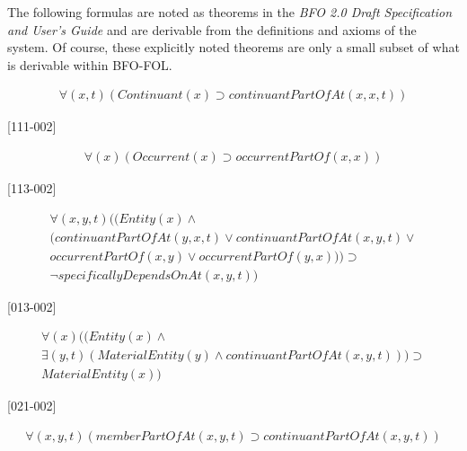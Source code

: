 \documentclass{article}
\begin{document}
The following formulas are noted as theorems in the \emph{BFO 2.0 Draft Specification and User's Guide} and are derivable from the definitions and axioms of the system.  Of course, these explicitly noted theorems are only a small subset of what is derivable within BFO-FOL.

\begin{flushright}

\begin{equation}
\begin{split}
{\forall}(x, t)(Continuant(x) \supset continuantPartOfAt(x, x, t))
\end{split}
\end{equation}

[111-002] 

\begin{equation}
\begin{split}
{\forall}(x)(Occurrent(x) \supset occurrentPartOf(x, x))
\end{split}
\end{equation}

[113-002] 

\begin{equation}
\begin{split}
{\forall}(x, y, t)((Entity(x) \wedge \\
(continuantPartOfAt(y, x, t) \vee continuantPartOfAt(x, y, t) \vee \\
occurrentPartOf(x, y) \vee occurrentPartOf(y, x))) \supset \\
{\neg}specificallyDependsOnAt(x, y, t))
\end{split}
\end{equation}

[013-002] 

\begin{equation}
\begin{split}
{\forall}(x)((Entity(x) \wedge \\
{\exists}(y, t)(MaterialEntity(y) \wedge continuantPartOfAt(x, y, t))) \supset \\
MaterialEntity(x))
\end{split}
\end{equation}

[021-002] 

\begin{equation}
\begin{split}
{\forall}(x, y, t)(memberPartOfAt(x, y, t) \supset continuantPartOfAt(x, y, t))
\end{split}
\end{equation}


\end{flushright}
\end{document}
